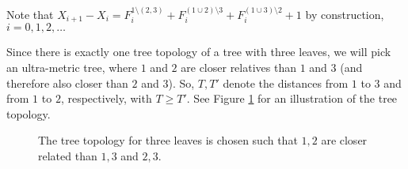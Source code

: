 \documentclass[preprint,authoryear]{elsarticle}
\theoremstyle{definition}
\numberwithin{equation}{section}
\numberwithin{figure}{section}
\begin{document}
Note that
$X_{i+1} - X_i = F_i^{\mathfrak 1 \setminus (\mathfrak 2, \mathfrak
  3)} + F_i^{(\mathfrak 1 \cup \mathfrak 2)\setminus \mathfrak 3} +
F_i^{(\mathfrak 1 \cup \mathfrak 3)\setminus \mathfrak 2} + 1$
by construction, $i=0,1,2,\dots$ 

Since there is exactly one tree topology of a tree with three leaves,
we will pick an ultra-metric tree, where $\mathfrak 1$ and
$\mathfrak 2$ are closer relatives than $\mathfrak 1$ and
$\mathfrak 3$ (and therefore also closer than $\mathfrak 2$ and
$\mathfrak 3$). So, $T, T'$ denote the distances from $\mathfrak 1$ to
$\mathfrak 3$ and from $\mathfrak 1$ to $\mathfrak 2$, respectively,
with $T\geq T'$. See Figure \ref{fig:1} for an illustration of the
tree topology.

\begin{figure}
\centering
 \caption{\label{fig:1}The tree topology for three leaves is chosen
   such that $\mathfrak 1, \mathfrak 2$ are closer related than
   $\mathfrak 1, \mathfrak 3$ and $\mathfrak 2, \mathfrak 3$. }
\end{figure}
\end{document}
